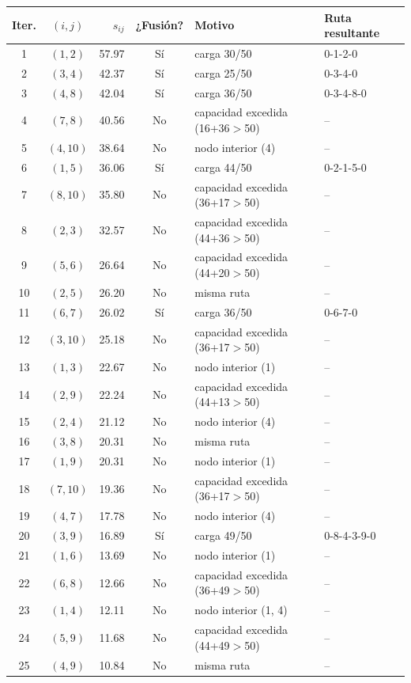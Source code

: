 \begin{tabular}{ccrcll}
\toprule
Iter. & $(i,j)$ & $s_{ij}$ & ¿Fusión? & Motivo & Ruta resultante \\
\midrule
1 & $(1,2)$ & 57.97 & Sí & carga 30/50 & 0-1-2-0 \\
2 & $(3,4)$ & 42.37 & Sí & carga 25/50 & 0-3-4-0 \\
3 & $(4,8)$ & 42.04 & Sí & carga 36/50 & 0-3-4-8-0 \\
4 & $(7,8)$ & 40.56 & No & capacidad excedida (16+36$>$50) & -- \\
5 & $(4,10)$ & 38.64 & No & nodo interior (4) & -- \\
6 & $(1,5)$ & 36.06 & Sí & carga 44/50 & 0-2-1-5-0 \\
7 & $(8,10)$ & 35.80 & No & capacidad excedida (36+17$>$50) & -- \\
8 & $(2,3)$ & 32.57 & No & capacidad excedida (44+36$>$50) & -- \\
9 & $(5,6)$ & 26.64 & No & capacidad excedida (44+20$>$50) & -- \\
10 & $(2,5)$ & 26.20 & No & misma ruta & -- \\
11 & $(6,7)$ & 26.02 & Sí & carga 36/50 & 0-6-7-0 \\
12 & $(3,10)$ & 25.18 & No & capacidad excedida (36+17$>$50) & -- \\
13 & $(1,3)$ & 22.67 & No & nodo interior (1) & -- \\
14 & $(2,9)$ & 22.24 & No & capacidad excedida (44+13$>$50) & -- \\
15 & $(2,4)$ & 21.12 & No & nodo interior (4) & -- \\
16 & $(3,8)$ & 20.31 & No & misma ruta & -- \\
17 & $(1,9)$ & 20.31 & No & nodo interior (1) & -- \\
18 & $(7,10)$ & 19.36 & No & capacidad excedida (36+17$>$50) & -- \\
19 & $(4,7)$ & 17.78 & No & nodo interior (4) & -- \\
20 & $(3,9)$ & 16.89 & Sí & carga 49/50 & 0-8-4-3-9-0 \\
21 & $(1,6)$ & 13.69 & No & nodo interior (1) & -- \\
22 & $(6,8)$ & 12.66 & No & capacidad excedida (36+49$>$50) & -- \\
23 & $(1,4)$ & 12.11 & No & nodo interior (1, 4) & -- \\
24 & $(5,9)$ & 11.68 & No & capacidad excedida (44+49$>$50) & -- \\
25 & $(4,9)$ & 10.84 & No & misma ruta & -- \\

\end{tabular}

